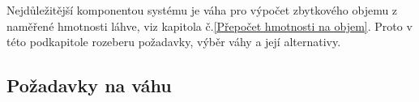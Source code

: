 Nejdůležitější komponentou systému je váha pro výpočet zbytkového objemu z naměřené hmotnosti láhve, viz kapitola č.\ref{Přepočet hmotnosti na objem}.  Proto v této podkapitole rozeberu požadavky, výběr váhy a její alternativy.
%
%
%
%
%
%
%
%
\subsection{Požadavky na váhu}



